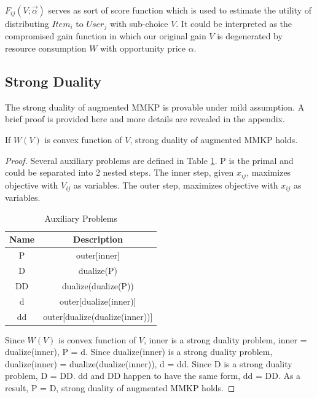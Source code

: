 \documentclass[sigconf]{acmart}
\newcommand{\sx}{x_{ij}}
\newcommand{\sV}{V_{ij}}
\newcommand{\sF}{F_{ij}}
\newcommand{\valpha}{\vec{\alpha}}
\begin{document}
$\sF(V; \valpha)$ serves as sort of score function which is used to estimate
    the utility of distributing $Item_i$ to $User_j$ with sub-choice $V$.
It could be interpreted as the compromised gain function in which
    our original gain $V$ is degenerated by resource consumption $W$ with opportunity price $\alpha$.

\subsection{Strong Duality}

The strong duality of augmented MMKP is provable under mild assumption.
A brief proof is provided here and more details are revealed in the appendix.

\begin{theorem} \label{StrongDualityTheorem}
If $W(V)$ is convex function of $V$, strong duality of augmented MMKP holds.
\end{theorem}

\begin{proof}
Several auxiliary problems are defined in Table \ref{TableAuxiliaryProblems}.
P is the primal and could be separated into 2 nested steps.
The inner step, given $\sx$, maximizes objective with $\sV$ as variables.
The outer step, maximizes objective with $\sx$ as variables.

\begin{table}
\caption{Auxiliary Problems\label{TableAuxiliaryProblems}}
\begin{center}
\begin{tabular}{|c|c|}
\hline
Name   & Description \\
\hline
P      & outer[inner] \\
\hline
D      & dualize(P) \\
\hline
DD     & dualize(dualize(P)) \\
\hline
d      & outer[dualize(inner)] \\
\hline
dd     & outer[dualize(dualize(inner))] \\
\hline
\end{tabular}
\end{center}
\end{table}

Since $W(V)$ is convex function of $V$, inner is a strong duality problem, inner = dualize(inner), P = d.
Since dualize(inner) is a strong duality problem, dualize(inner) = dualize(dualize(inner)), d = dd.
Since D is a strong duality problem, D = DD.
dd and DD happen to have the same form, dd = DD.
As a result, P = D, strong duality of augmented MMKP holds.
\end{proof}
\end{document}

